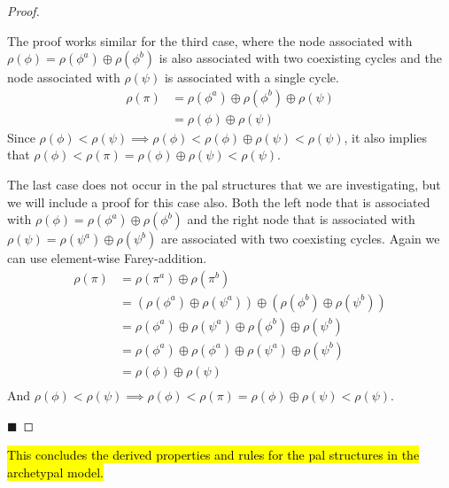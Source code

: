 \begin{proof}
\begin{itemize}
			The proof works similar for the third case, where the node associated with $\rho(\phi) = \rho(\phi^a) \oplus \rho(\phi^b)$ is also associated with two coexisting cycles and the node associated with $\rho(\psi)$ is associated with a single cycle.
			\begin{align*}
				\rho(\pi) & = \rho(\phi^a) \oplus \rho(\phi^b) \oplus \rho(\psi) \\
				          & = \rho(\phi) \oplus \rho(\psi)
			\end{align*}
			Since $\rho(\phi) < \rho(\psi) \implies \rho(\phi) < \rho(\phi) \oplus \rho(\psi) < \rho(\psi)$, it also implies that $ \rho(\phi) < \rho(\pi) = \rho(\phi) \oplus \rho(\psi) < \rho(\psi)$.

			The last case does not occur in the \gls{pal} structures that we are investigating, but we will include a proof for this case also.
			Both the left node that is associated with $\rho(\phi) = \rho(\phi^a) \oplus \rho(\phi^b)$ and the right node that is associated with $\rho(\psi) = \rho(\psi^a) \oplus \rho(\psi^b)$ are associated with two coexisting cycles.
			Again we can use element-wise Farey-addition.
			\begin{align*}
				\rho(\pi) & = \rho(\pi^a) \oplus \rho(\pi^b)                                                                     \\
				          & = \left(\rho(\phi^a) \oplus \rho(\psi^a)\right) \oplus \left(\rho(\phi^b) \oplus \rho(\psi^b)\right) \\
				          & = \rho(\phi^a) \oplus \rho(\psi^a) \oplus \rho(\phi^b) \oplus \rho(\psi^b)                           \\
				          & = \rho(\phi^a) \oplus \rho(\phi^a) \oplus \rho(\psi^a) \oplus \rho(\psi^b)                           \\
				          & = \rho(\phi) \oplus \rho(\psi)                                                                       \\
			\end{align*}
			And $\rho(\phi) < \rho(\psi) \implies \rho(\phi) < \rho(\pi) = \rho(\phi) \oplus \rho(\psi) < \rho(\psi)$.
	\end{itemize}
	\hfill $\blacksquare$
\end{proof}

\hl{
	This concludes the derived properties and rules for the \gls{pal} structures in the archetypal model.
}
